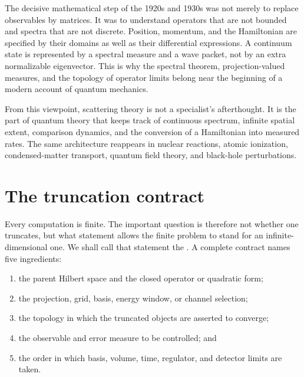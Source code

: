 The decisive mathematical step of the 1920s and 1930s was not merely to
replace observables by matrices.  It was to understand operators that are not
bounded and spectra that are not discrete.  Position, momentum, and the
Hamiltonian are specified by their domains as well as their differential
expressions.  A continuum state is represented by a spectral measure and a
wave packet, not by an extra normalizable eigenvector.  This is why the
spectral theorem, projection-valued measures, and the topology of operator
limits belong near the beginning of a modern account of quantum mechanics.

From this viewpoint, scattering theory is not a specialist's afterthought.
It is the part of quantum theory that keeps track of continuous spectrum,
infinite spatial extent, comparison dynamics, and the conversion of a
Hamiltonian into measured rates.  The same architecture reappears in nuclear
reactions, atomic ionization, condensed-matter transport, quantum field
theory, and black-hole perturbations.

\section*{The truncation contract}
{}

Every computation is finite.  The important question is therefore not
whether one truncates, but what statement allows the finite problem to stand
for an infinite-dimensional one.  We shall call that statement the
.  A complete contract names five ingredients:

\begin{enumerate}[label=(\roman*)]
  \item the parent Hilbert space and the closed operator or quadratic form;
  \item the projection, grid, basis, energy window, or channel selection;
  \item the topology in which the truncated objects are asserted to converge;
  \item the observable and error measure to be controlled; and
  \item the order in which basis, volume, time, regulator, and detector limits
  are taken.
\end{enumerate}

